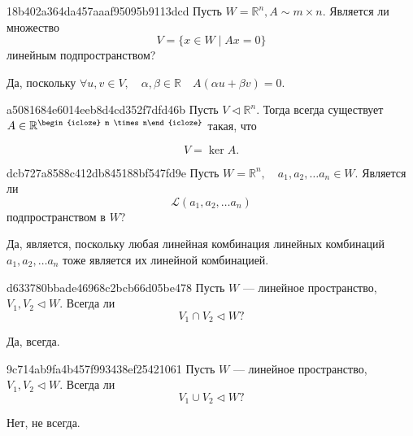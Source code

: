 \begin{note}{18b402a364da457aaaf95095b9113dcd}
    Пусть \( W = \mathbb R ^{n}, A \sim m \times n. \)
    Является ли множество
    \[
        V = \{ x \in W \mid Ax = 0  \}
    \]
    линейным подпространством?

    \begin{cloze}{1}
        Да, поскольку \( \forall u, v \in V, \quad \alpha, \beta \in \mathbb R \quad A(\alpha u + \beta v) = 0. \)
    \end{cloze}
\end{note}

\begin{note}{a5081684e6014eeb8d4cd352f7dfd46b}
    Пусть \( V \triangleleft \mathbb R ^{n}. \) Тогда всегда существует \( A \in \mathbb R ^{\begin{icloze}{2}m \times n\end{icloze}}  \) такая, что
    \begin{icloze}{1}\[
        V = \ker A.
    \]\end{icloze}
\end{note}

\begin{note}{dcb727a8588c412db845188bf547fd9e}
    Пусть \( W = \mathbb R ^{n}, \quad a_1, a_2, \ldots a_n \in W. \) Является ли
    \[
        \mathscr L (a_1, a_2, \ldots a_n)
    \]
    подпространством в \( W \)?

    \begin{cloze}{1}
        Да, является, поскольку любая линейная комбинация линейных комбинаций \( a_1, a_2, \ldots a_n  \)  тоже является их линейной комбинацией.
    \end{cloze}
\end{note}

\begin{note}{d633780bbade46968c2bcb66d05be478}
    Пусть \( W \) --- линейное пространство, \( V_1, V_2 \triangleleft W \).
    Всегда ли
    \[
        V_1 \cap V_2 \triangleleft W?
    \]


    \begin{cloze}{1}
        Да, всегда.
    \end{cloze}
\end{note}

\begin{note}{9c714ab9fa4b457f993438ef25421061}
    Пусть \( W \) --- линейное пространство, \( V_1, V_2 \triangleleft W \).
    Всегда ли
    \[
        V_1 \cup V_2 \triangleleft W?
    \]

    \begin{cloze}{1}
        Нет, не всегда.
    \end{cloze}
\end{note}

